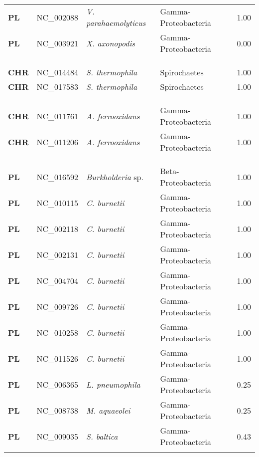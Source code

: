 \begin{adjustwidth}{-3cm}{2cm}
{\begin{supertabular}{>{\bfseries}l|p{0.1\textwidth}p{0.14\textwidth}l|l}
PL & NC\_002088 &  \textit{V. parahaemolyticus} & Gamma-Proteobacteria & 1.00\\
PL & NC\_003921 &  \textit{X. axonopodis} & Gamma-Proteobacteria & 0.00\\
\\
\\
\hline\\
CHR & NC\_014484 &  \textit{S. thermophila} & Spirochaetes & 1.00\\
CHR & NC\_017583 &  \textit{S. thermophila} & Spirochaetes & 1.00\\
\\
\\
\hline\\
CHR & NC\_011761 &  \textit{A. ferrooxidans} & Gamma-Proteobacteria & 1.00\\
CHR & NC\_011206 &  \textit{A. ferrooxidans} & Gamma-Proteobacteria & 1.00\\
\\
\\
\hline\\
PL & NC\_016592 & \textit{Burkholderia} sp. & Beta-Proteobacteria & 1.00\\
PL & NC\_010115 & \textit{C. burnetii} & Gamma-Proteobacteria & 1.00\\
PL & NC\_002118 & \textit{C. burnetii} & Gamma-Proteobacteria & 1.00\\
PL & NC\_002131 & \textit{C. burnetii} & Gamma-Proteobacteria & 1.00\\
PL & NC\_004704 & \textit{C. burnetii} & Gamma-Proteobacteria & 1.00\\
PL & NC\_009726 & \textit{C. burnetii} & Gamma-Proteobacteria & 1.00\\
PL & NC\_010258 & \textit{C. burnetii} & Gamma-Proteobacteria & 1.00\\
PL & NC\_011526 & \textit{C. burnetii} & Gamma-Proteobacteria & 1.00\\
PL & NC\_006365 & \textit{L. pneumophila} & Gamma-Proteobacteria & 0.25\\
PL & NC\_008738 & \textit{M. aquaeolei} & Gamma-Proteobacteria & 0.25\\
PL & NC\_009035 & \textit{S. baltica} & Gamma-Proteobacteria & 0.43\\
\\

\end{supertabular}}
\end{adjustwidth}
